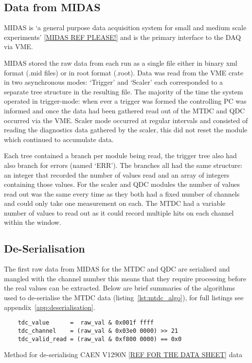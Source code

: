 \documentclass[]{article}
\begin{document}
\subsection{Data from MIDAS} %
\label{sub:data_from_midas}
MIDAS is `a general purpose data acquisition system for small and medium scale experiments' \ref{MIDAS REF PLEASE!} and is the primary interface to the DAQ via VME. 

MIDAS stored the raw data from each run as a single file either in binary xml format (.mid files) or in root format (.root). Data was read from the VME crate in two asynchronous modes: `Trigger' and `Scaler' each corresponded to a separate tree structure in the resulting file. The majority of the time the system operated in trigger-mode: when ever a trigger was formed the controlling PC was informed and once the data had been gathered read out of the MTDC and QDC occurred via the VME. Scaler mode occurred at regular intervals and consisted of reading the diagnostics data gathered by the scaler, this did not reset the module which continued to accumulate data. 

Each tree contained a branch per module being read, the trigger tree also had also branch for errors (named `ERR'). The branches all had the same structure: an integer that recorded the number of values read and an array of integers containing those values. For the scaler and QDC modules the number of values read out was the same every time as they both had a fixed number of channels and could only take one measurement on each. The MTDC had a variable number of values to read out as it could record multiple hits on each channel within the window.
\subsection{De-Serialisation} %
\label{sub:de_serialisation}
The first raw data from MIDAS for the MTDC and QDC are serialised and mangled with the channel number this means that they require processing before the real values can be extracted. Below are brief summaries of the algorithms used to de-serialise the MTDC data (listing~\ref{lst:mtdc_algo}), for full listings see appendix~\ref{app:deserialisation}.
%
\begin{listing}[htbp]
	\begin{verbatim}
    tdc_value      =  raw_val & 0x001f ffff
    tdc_channel    = (raw_val & 0x03e0 0000) >> 21
    tdc_valid_read = (raw_val & 0xf800 0000) == 0x0
	\end{verbatim}
	\caption{Method for de-serialising CAEN V1290N \ref{REF FOR THE DATA SHEET} data}
	\label{lst:mtdc_algo}
\end{listing}
\end{document}
